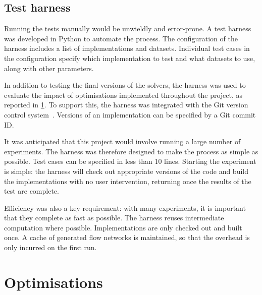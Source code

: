 \subsection{Test harness} \label{sec:impl-benchmark-harness}

Running the tests manually would be unwieldly and error-prone. A test harness was developed in Python to automate the process. The configuration of the harness includes a list of implementations and datasets. Individual test cases in the configuration specify which implementation to test and what datasets to use, along with other parameters.

In addition to testing the final versions of the solvers, the harness was used to evaluate the impact of optimisations implemented throughout the project, as reported in \cref{sec:eval-optimisations}. To support this, the harness was integrated with the Git version control system~\cite{GitWWW}. Versions of an implementation can be specified by a Git commit ID.

It was anticipated that this project would involve running a large number of experiments. The harness was therefore designed to make the process as simple as possible. Test cases can be specified in less than 10 lines. Starting the experiment is simple: the harness will check out appropriate versions of the code and build the implementations with no user intervention, returning once the results of the test are complete.

Efficiency was also a key requirement: with many experiments, it is important that they complete as fast as possible. The harness reuses intermediate computation where possible. Implementations are only checked out and built once. A cache of generated flow networks is maintained\footnotemark, so that the overhead is only incurred on the first run.


\section{Optimisations} \label{sec:eval-optimisations}

